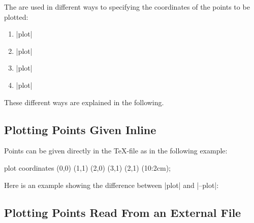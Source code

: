The  are used in different ways to specifying the
coordinates of the points to be plotted:
%
\begin{enumerate}
    \item \opt{|--|}|plot|
    \item \opt{|--|}|plot|
    \item \opt{|--|}|plot|
    \item \opt{|--|}|plot|
\end{enumerate}

These different ways are explained in the following.


\subsection{Plotting Points Given Inline}

Points can be given directly in the \TeX-file as in the following example:
%
\begin{codeexample}[]
\tikz \draw plot coordinates {(0,0) (1,1) (2,0) (3,1) (2,1) (10:2cm)};
\end{codeexample}

Here is an example showing the difference between |plot| and |--plot|:
%
\begin{codeexample}[]
\end{codeexample}


\subsection{Plotting Points Read From an External File}


